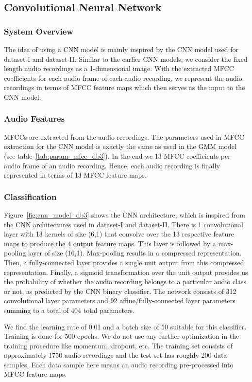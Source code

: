 \subsection{Convolutional Neural Network}

\subsubsection{System Overview}
The idea of using a CNN model is mainly inspired by the CNN model used for dataset-I and dataset-II. Similar to the earlier CNN models, we consider the fixed length audio recordings as a 1-dimensional image. With the extracted MFCC coefficients for each audio frame of each audio recording, we represent the audio recordings in terms of MFCC feature maps which then serves as the input to the CNN model.

\subsubsection{Audio Features}
MFCCs are extracted from the audio recordings. The parameters used in MFCC extraction for the CNN model is exactly the same as used in the GMM model (see table~\ref{tab:param_mfcc_db3}). In the end we 13 MFCC coefficients per audio frame of an audio recording. Hence, each audio recording is finally represented in terms of 13 MFCC feature maps.

\subsubsection{Classification}

Figure~\ref{fig:cnn_model_db3} shows the CNN architecture, which is inspired from the CNN architectures used in dataset-I and dataset-II. There is 1 convolutional layer with 13 kernels of size (6,1) that convolve over the 13 respective feature maps to produce the 4 output feature maps. This layer is followed by a max-pooling layer of size (16,1). Max-pooling results in a compressed representation. Then, a fully-connected layer provides a single unit output from this compressed representation. Finally, a sigmoid transformation over the unit output provides us the probability of whether the audio recording belongs to a particular audio class or not, as predicted by the CNN binary classifier. The network consists of 312 convolutional layer parameters and 92 affine/fully-connected layer parameters summing to a total of 404 total parameters.

We find the learning rate of 0.01 and a batch size of 50 suitable for this classifier. Training is done for 500 epochs. We do not use any further optimization in the training procedure like momentum, dropout, etc. The training set consists of approximately 1750 audio recordings and the test set has roughly 200 data samples. Each data sample here means an audio recording pre-processed into MFCC feature maps.

